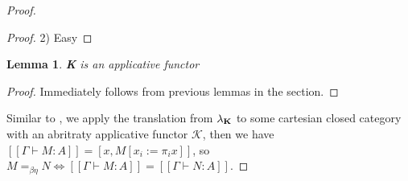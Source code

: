 \documentclass[a4paper]{article}
\newtheorem{lemma}{Lemma}
\begin{document}
\begin{proof}
\begin{proof}
\vspace{\baselineskip}

2) Easy

\end{proof}

\begin{lemma}

  {\bf K} is an applicative functor
\end{lemma}

\begin{proof}
  Immediately follows from previous lemmas in the section.
\end{proof}

Similar to \cite{Abramsky}, we apply the translation from $\lambda_{{\bf K}}$ to some cartesian closed category with an abritraty applicative functor $\mathcal{K}$, then
we have $[\![\Gamma \vdash M : A]\!] = [x, M [x_i := \pi_i x]]$, so $M =_{\beta \eta} N \Leftrightarrow [\![\Gamma \vdash M : A]\!] = [\![\Gamma \vdash N : A]\!]$.

\end{proof}


\end{document}

